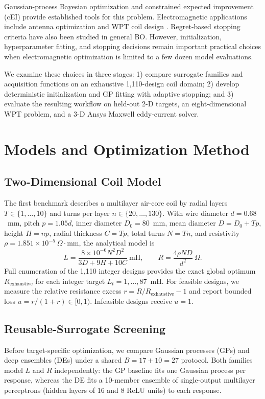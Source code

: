 \documentclass[10pt,conference,letterpaper]{IEEEtran}
\begin{document}
Gaussian-process Bayesian optimization and constrained expected improvement (cEI) \cite{gardner} provide established tools for this problem. Electromagnetic applications include antenna optimization \cite{liu2014,wu2024} and WPT coil design \cite{sim2023}. Regret-based stopping criteria \cite{ishibashi2023} have also been studied in general BO. However, initialization, hyperparameter fitting, and stopping decisions remain important practical choices when electromagnetic optimization is limited to a few dozen model evaluations.

We examine these choices in three stages: 1) compare surrogate families and acquisition functions on an exhaustive 1,110-design coil domain; 2) develop deterministic initialization and GP fitting with adaptive stopping; and 3) evaluate the resulting workflow on held-out 2-D targets, an eight-dimensional WPT problem, and a 3-D Ansys Maxwell eddy-current solver.

\section{Models and Optimization Method}
\subsection{Two-Dimensional Coil Model}
The first benchmark describes a multilayer air-core coil by radial layers $T\in\{1,\ldots,10\}$ and turns per layer $n\in\{20,\ldots,130\}$. With wire diameter $d=0.68$~mm, pitch $p=1.05d$, inner diameter $D_0=80$~mm, mean diameter $D=D_0+Tp$, height $H=np$, radial thickness $C=Tp$, total turns $N=Tn$, and resistivity $\rho=1.851\times10^{-5}~\Omega\!\cdot\!\mathrm{mm}$, the analytical model is
\begin{equation}
 L=\frac{8\times10^{-6}N^2D^2}{3D+9H+10C}\ \mathrm{mH},\qquad
 R=\frac{4\rho ND}{d^2}\ \Omega.
 \label{eq:coil}
\end{equation}
Full enumeration of the 1,110 integer designs provides the exact global optimum $R_{\text{exhaustive}}$ for each integer target $L_t=1,\ldots,87$~mH. For feasible designs, we measure the relative resistance excess $r=R/R_{\text{exhaustive}}-1$ and report bounded loss $u=r/(1+r)\in[0,1)$. Infeasible designs receive $u=1$.

\subsection{Reusable-Surrogate Screening}
Before target-specific optimization, we compare Gaussian processes (GPs) and deep ensembles (DEs) under a shared $B=17+10=27$ protocol. Both families model $L$ and $R$ independently: the GP baseline fits one Gaussian process per response, whereas the DE fits a 10-member ensemble of single-output multilayer perceptrons (hidden layers of 16 and 8 ReLU units) to each response.
\end{document}

